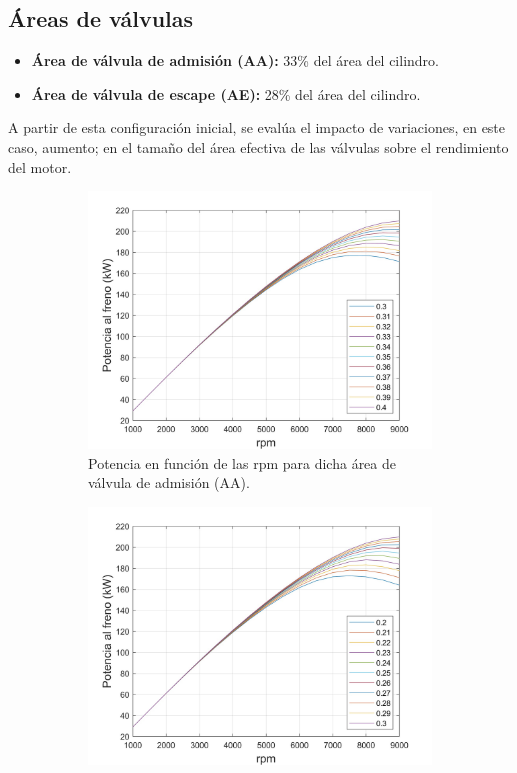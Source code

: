 \subsection{Áreas de válvulas} \label{s:subsection_02}
\begin{itemize}
   \item \textbf{Área de válvula de admisión (AA):} 33\%  del área del cilindro.
  \item \textbf{Área de válvula de escape (AE):} 28\%  del área del cilindro.
  \end{itemize}

A partir de esta configuración inicial, se evalúa el impacto de variaciones, en este caso, aumento; en el tamaño del área efectiva de las válvulas sobre el rendimiento del motor.

\begin{figure}[H]
    \centering
    \begin{subfigure}[b]{0.45\textwidth}
        \centering
        \includegraphics[width=\linewidth]{Figures/01/Potencia_rpm_aval_admision.jpg}
        \caption{Potencia en función de las rpm para dicha área de válvula de admisión (AA).}
        \label{fig:RPM_aval_admision}
    \end{subfigure}
    \hfill
    \begin{subfigure}[b]{0.45\textwidth}
        \centering
        \includegraphics[width=\linewidth]{Figures/01/Potencia_rpm_aval_escape.jpg}

\end{subfigure}
\end{figure}
